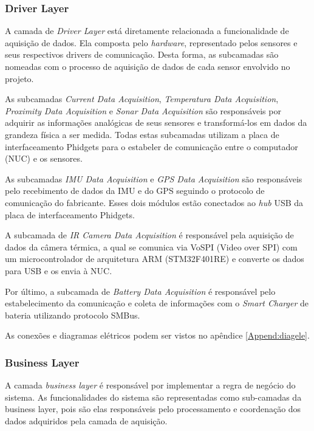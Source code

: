 \subsubsection{Driver Layer}
	
A camada de \textit{Driver Layer} está diretamente relacionada a funcionalidade de aquisição de dados. Ela composta pelo \textit{hardware}, representado pelos sensores e seus respectivos drivers de comunicação. Desta forma, as subcamadas são nomeadas com o processo de aquisição de dados de cada sensor envolvido no projeto.

As subcamadas \textit{Current Data Acquisition}, \textit{Temperatura Data Acquisition}, \textit{Proximity Data Acquisition} e \textit{Sonar Data Acquisition} são responsáveis por adquirir as informações analógicas de seus sensores e transformá-los em dados da grandeza física a ser medida. Todas estas subcamadas utilizam a placa de interfaceamento Phidgets para o estabeler de comunicação entre o computador (NUC) e os sensores.

As subcamadas \textit{IMU Data Acquisition} e \textit{GPS Data Acquisition} são responsáveis pelo recebimento de dados da IMU e do GPS seguindo o protocolo de comunicação do fabricante. Esses dois módulos estão conectados ao \textit{hub} USB da placa de interfaceamento Phidgets. 

A subcamada de \textit{IR Camera Data Acquisition} é responsável pela aquisição de dados da câmera térmica, a qual se comunica via VoSPI (Video over SPI) com um microcontrolador de arquitetura ARM (STM32F401RE) e converte os dados para USB e os envia à NUC. 

Por último, a subcamada de \textit{Battery Data Acquisition} é responsável pelo estabelecimento da comunicação e coleta de informações com o \textit{Smart Charger} de bateria utilizando protocolo SMBus.

As conexões e diagramas elétricos podem ser vistos no apêndice \ref{Append:diagele}.

\subsubsection{Business Layer}

A camada \textit{business layer} é responsável por implementar a regra de negócio do sistema. As funcionalidades do sistema são representadas como sub-camadas da business layer, pois são elas responsáveis pelo processamento e coordenação dos dados adquiridos pela camada de aquisição.

